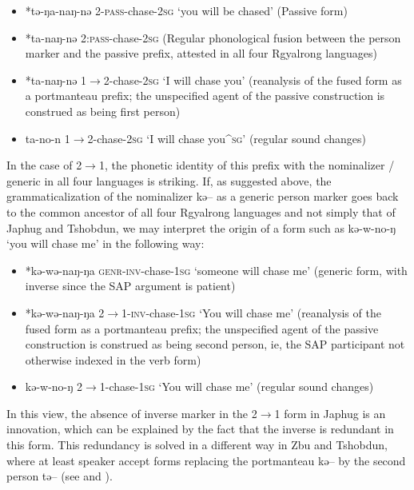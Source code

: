 \documentclass[oldfontcommands,oneside,a4paper,11pt]{article}
\newcommand{\ipa}[1]{{\phon \mbox{#1}}} %
\begin{document}
\begin{itemize}
\item *\ipa{tə-ŋa-naŋ-nə}  2-\textsc{pass}-chase-\textsc{2sg} `you will be chased' (Passive form)
\item *\ipa{ta-naŋ-nə}  2:\textsc{pass}-chase-\textsc{2sg} (Regular phonological fusion between the person marker and the passive prefix, attested in all four Rgyalrong languages)  
\item  *\ipa{ta-naŋ-nə}  1$\rightarrow$2-chase-\textsc{2sg} `I will chase you' (reanalysis of the fused form as a portmanteau prefix; the unspecified agent of the passive construction is construed as being first person)
\item  \ipa{ta-no-n} 1$\rightarrow$2-chase-\textsc{2sg} `I will chase you^{\textsc{sg}}' (regular sound changes)
\end{itemize}


In the case of 2$\rightarrow$1, the phonetic identity of this prefix with the nominalizer / generic in all four languages is striking. If, as suggested above, the grammaticalization of the nominalizer \ipa{kə--} as a generic person marker goes back to the common ancestor of all four Rgyalrong languages and not simply that of Japhug and Tshobdun, we may interpret the origin of a form such as \ipa{kə-w-no-ŋ} `you will chase me' in the following way:


\begin{itemize}
\item *\ipa{kə-wə-naŋ-ŋa}  \textsc{genr}-\textsc{inv}-chase-\textsc{1sg} `someone will chase me' (generic form, with inverse since the SAP argument is patient)
\item  *\ipa{kə-wə-naŋ-ŋa}  2$\rightarrow$1-\textsc{inv}-chase-\textsc{1sg} `You will chase me' (reanalysis of the fused form as a portmanteau prefix; the unspecified agent of the passive construction is construed as being second person, ie, the SAP participant not otherwise indexed in the verb form)
\item  \ipa{kə-w-no-ŋ} 2$\rightarrow$1-chase-\textsc{1sg} `You will chase me'  (regular sound changes)
\end{itemize}

In this view, the absence of inverse marker in the  2$\rightarrow$1 form in Japhug is an innovation, which can be explained by the fact that the inverse is redundant in this form. This redundancy is solved in a different way in Zbu and Tshobdun, where at least speaker accept forms replacing the portmanteau \ipa{kə--} by the second person \ipa{tə--} (see \citealt{jackson02rentongdengdi} and \citealt{gongxun14agreement}).
 
\end{document}
